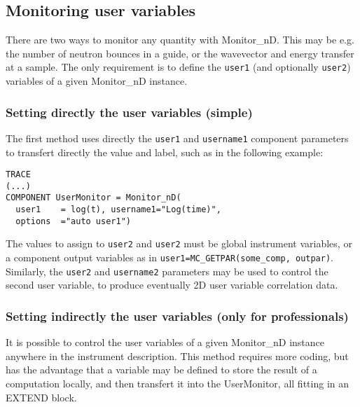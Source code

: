 \subsection{Monitoring user variables}
\label{s:monnd:user}

There are two ways to monitor any quantity with Monitor\_nD. This may be e.g. the number of neutron bounces in a guide, or the wavevector and energy transfer at a sample. The only requirement is to define the \verb+user1+ (and optionally \verb+user2+) variables of a given Monitor\_nD instance.

\subsubsection{Setting directly the user variables (simple)}

The first method uses directly the \verb+user1+ and \verb+username1+ component parameters to transfert directly the value and label, such as in the following example:
\begin{verbatim}
TRACE
(...)
COMPONENT UserMonitor = Monitor_nD(
  user1    = log(t), username1="Log(time)",
  options  ="auto user1")
\end{verbatim}
The values to assign to \verb+user2+ and \verb+user2+ must be global instrument variables, or a component output variables as in \verb+user1=MC_GETPAR(some_comp, outpar)+.
Similarly, the \verb+user2+ and \verb+username2+ parameters may be used to control the second user variable, to produce eventually 2D user variable correlation data.

\subsubsection{Setting indirectly the user variables (only for professionals)}

It is possible to control the user variables of a given Monitor\_nD instance anywhere in the instrument description. This method requires more coding, but has the advantage that a variable may be defined to store the result of a computation locally, and then transfert it into the UserMonitor, all fitting in an EXTEND block.

